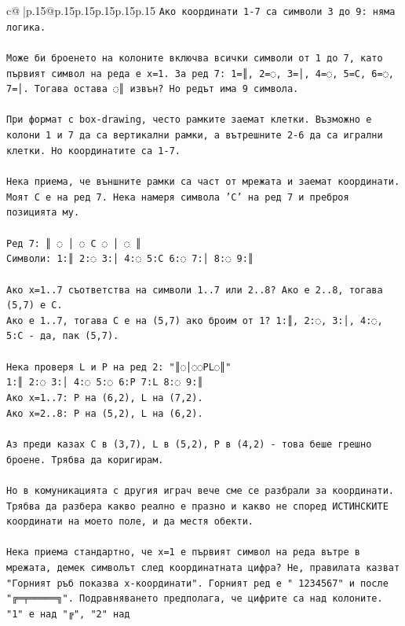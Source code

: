 \documentclass{article}
\begin{document}
{\begin{supertabular}{c@{$\;$}|p{.15\linewidth}@{}p{.15\linewidth}p{.15\linewidth}p{.15\linewidth}p{.15\linewidth}p{.15\linewidth}}
{{{\texttt{Ако координати 1{-}7 са символи 3 до 9: няма логика.} \\
\\ 
\texttt{Може би броенето на колоните включва всички символи от 1 до 7, като първият символ на реда е x=1. За ред 7: 1=║, 2=◌, 3=│, 4=◌, 5=C, 6=◌, 7=│. Тогава остава ◌║ извън? Но редът има 9 символа.} \\
\\ 
\texttt{При формат с box{-}drawing, често рамките заемат клетки. Възможно е колони 1 и 7 да са вертикални рамки, а вътрешните 2{-}6 да са игрални клетки. Но координатите са 1{-}7.} \\
\\ 
\texttt{Нека приема, че външните рамки са част от мрежата и заемат координати. Моят C е на ред 7. Нека намеря символа 'C' на ред 7 и преброя позицията му.} \\
\\ 
\texttt{Ред 7: ║ ◌ │ ◌ C ◌ │ ◌ ║} \\
\texttt{Символи: 1:║ 2:◌ 3:│ 4:◌ 5:C 6:◌ 7:│ 8:◌ 9:║} \\
\\ 
\texttt{Ако x=1..7 съответства на символи 1..7 или 2..8? Ако е 2..8, тогава (5,7) е C.} \\
\texttt{Ако е 1..7, тогава C е на (5,7) ако броим от 1? 1:║, 2:◌, 3:│, 4:◌, 5:C {-} да, пак (5,7).} \\
\\ 
\texttt{Нека проверя L и P на ред 2: "║◌│◌◌PL◌║"} \\
\texttt{1:║ 2:◌ 3:│ 4:◌ 5:◌ 6:P 7:L 8:◌ 9:║} \\
\texttt{Ако x=1..7: P на (6,2), L на (7,2).} \\
\texttt{Ако x=2..8: P на (5,2), L на (6,2).} \\
\\ 
\texttt{Аз преди казах C в (3,7), L в (5,2), P в (4,2) {-} това беше грешно броене. Трябва да коригирам.} \\
\\ 
\texttt{Но в комуникацията с другия играч вече сме се разбрали за координати. Трябва да разбера какво реално е празно и какво не според ИСТИНСКИТЕ координати на моето поле, и да местя обекти.} \\
\\ 
\texttt{Нека приема стандартно, че x=1 е първият символ на реда вътре в мрежата, демек символът след координатната цифра? Не, правилата казват "Горният ръб показва x{-}координати". Горният ред е " 1234567" и после "╔═╤═════╗". Подравняването предполага, че цифрите са над колоните. "1" е над "╔", "2" над} \\
            }
        }
    }
     \\ \\


\end{supertabular}}
\end{document}
